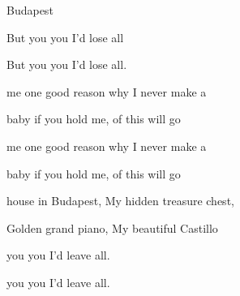 \begin{SBSong}{Budapest}
\begin{SBVerse}
     But  you you I'd lose  all
     
     But  you you I'd lose  all.
  \end{SBVerse} 
  \CBPageBrk
  \begin{SBChorus}  
      me one good reason why I  never make a 
     
      baby if you hold me,  of this will go 
     
      me one good reason why I  never make a 
     
      baby if you hold me,  of this will go 
  \end{SBChorus}   
  \begin{SBVerse}
      house in Budapest, My hidden treasure chest,
     
     Golden grand piano, My beautiful Castillo
     
      you you I'd leave  all.
     
      you you I'd leave  all.
  \end{SBVerse}
\end{SBSong}  
